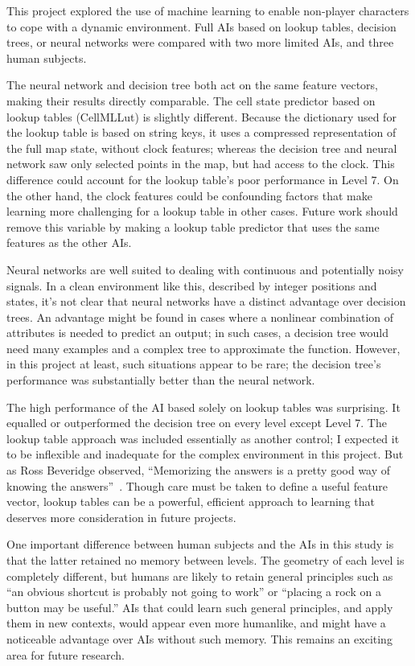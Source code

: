 \documentclass{article}
\begin{document}
This project explored the use of machine learning to enable non-player characters to cope with a dynamic environment.  Full AIs based on lookup tables, decision trees, or neural networks were compared with two more limited AIs, and three human subjects.

The neural network and decision tree both act on the same feature vectors, making their results directly comparable.  The cell state predictor based on lookup tables (CellMLLut) is slightly different.  Because the dictionary used for the lookup table is based on string keys, it uses a compressed representation of the full map state, without clock features; whereas the decision tree and neural network saw only selected points in the map, but had access to the clock.  This difference could account for the lookup table's poor performance in Level 7.  On the other hand, the clock features could be confounding factors that make learning more challenging for a lookup table in other cases.  Future work should remove this variable by making a lookup table predictor that uses the same features as the other AIs.

Neural networks are well suited to dealing with continuous and potentially noisy signals.  In a clean environment like this, described by integer positions and states, it's not clear that neural networks have a distinct advantage over decision trees.  An advantage might be found in cases where a nonlinear combination of attributes is needed to predict an output; in such cases, a decision tree would need many examples and a complex tree to approximate the function.  However, in this project at least, such situations appear to be rare; the decision tree's performance was substantially better than the neural network.

The high performance of the AI based solely on lookup tables was surprising.  It equalled or outperformed the decision tree on every level except Level 7.  The lookup table approach was included essentially as another control; I expected it to be inflexible and inadequate for the complex environment in this project.  But as Ross Beveridge observed, ``Memorizing the answers is a pretty good way of knowing the answers''~\cite{ROSSCHAT}.  Though care must be taken to define a useful feature vector, lookup tables can be a powerful, efficient approach to learning that deserves more consideration in future projects.

One important difference between human subjects and the AIs in this study is that the latter retained no memory between levels.  The geometry of each level is completely different, but humans are likely to retain general principles such as ``an obvious shortcut is probably not going to work'' or ``placing a rock on a button may be useful.''  AIs that could learn such general principles, and apply them in new contexts, would appear even more humanlike, and might have a noticeable advantage over AIs without such memory.  This remains an exciting area for future research.




\end{document}

